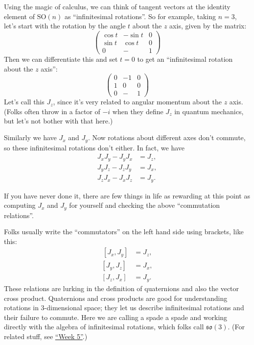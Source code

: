 \documentclass{article}
\begin{document}
Using the magic of calculus, we can think of tangent vectors at the
identity element of \(\mathrm{SO}(n)\) as ``infinitesimal rotations''.
So for example, taking \(n = 3\), let's start with the rotation by the
angle \(t\) about the \(z\) axis, given by the matrix: \[
  \left(
    \begin{array}{ccc}
      \cos t & -\sin t & 0
    \\\sin t & \cos t & 0
    \\0 & - & 1
    \end{array}
  \right)
\] Then we can differentiate this and set \(t = 0\) to get an
``infinitesimal rotation about the \(z\) axis'': \[
  \left(
    \begin{array}{ccc}
      0 & -1 & 0
    \\1 & 0 & 0
    \\0 & - & 1
    \end{array}
  \right)
\] Let's call this \(J_z\), since it's very related to angular momentum
about the \(z\) axis. (Folks often throw in a factor of \(-i\) when they
define \(J_z\) in quantum mechanics, but let's not bother with that
here.)

Similarly we have \(J_x\) and \(J_y\). Now rotations about different
axes don't commute, so these infinitesimal rotations don't either. In
fact, we have \[
  \begin{aligned}
    J_x J_y - J_y J_x &= J_z,
  \\J_y J_z - J_z J_y &= J_x,
  \\J_z J_x - J_x J_z &= J_y.
  \end{aligned}
\]

If you have never done it, there are few things in life as rewarding at
this point as computing \(J_x\) and \(J_y\) for yourself and checking
the above ``commutation relations''.

Folks usually write the ``commutators'' on the left hand side using
brackets, like this: \[
  \begin{aligned}
    \,[J_x,J_y] &= J_z,
  \\ [J_y,J_z] &= J_x,
  \\ [J_z,J_x] &= J_y.
  \end{aligned}
\] These relations are lurking in the definition of quaternions and also
the vector cross product. Quaternions and cross products are good for
understanding rotations in \(3\)-dimensional space; they let us describe
infinitesimal rotations and their failure to commute. Here we are
calling a spade a spade and working directly with the algebra of
infinitesimal rotations, which folks call \(\mathfrak{so}(3)\). (For
related stuff, see \protect\hyperlink{week5}{``Week 5''}.)
\end{document}

